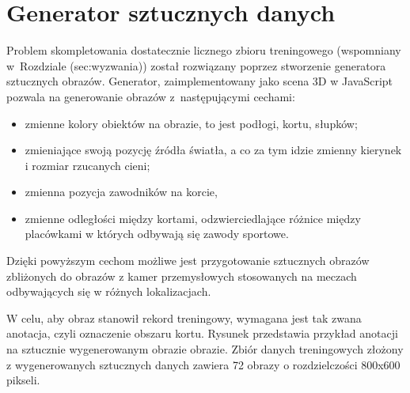 \newpage
\section{Generator sztucznych danych}
\label{sec:generator}

Problem skompletowania dostatecznie licznego zbioru treningowego (wspomniany w~Rozdziale \numberref(sec:wyzwania)) został rozwiązany poprzez stworzenie generatora sztucznych obrazów.
Generator, zaimplementowany jako scena 3D w JavaScript pozwala na generowanie obrazów z~następującymi cechami:

\begin{itemize}
	\item zmienne kolory obiektów na obrazie, to jest podłogi, kortu, słupków;
	\item zmieniające swoją pozycję źródła światła, a co za tym idzie zmienny kierynek i rozmiar rzucanych cieni;
	\item zmienna pozycja zawodników na korcie, 
	\item zmienne odległości między kortami, odzwierciedlające różnice między placówkami w których odbywają się zawody sportowe.
\end{itemize}

Dzięki powyższym cechom możliwe jest przygotowanie sztucznych obrazów zbliżonych do obrazów z kamer przemysłowych stosowanych na meczach odbywających się w różnych lokalizacjach.

W celu, aby obraz stanowił rekord treningowy, wymagana jest tak zwana anotacja, czyli oznaczenie obszaru kortu. Rysunek  przedstawia przykład anotacji na sztucznie wygenerowanym obrazie obrazie.
Zbiór danych treningowych złożony z wygenerowanych sztucznych danych zawiera 72 obrazy o rozdzielczości 800x600 pikseli.

